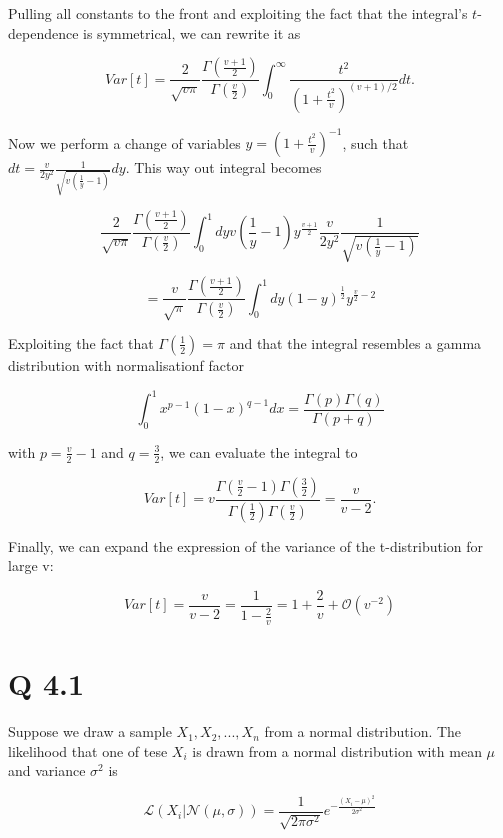 \documentclass[11pt]{article}
\begin{document}
Pulling all constants to the front and exploiting the fact that the
integral's \(t\)-dependence is symmetrical, we can rewrite it as

\[Var[t]= \frac{2}{\sqrt{v  \pi}} \frac{\Gamma{\left( \frac{v+1}{2} \right)}}{\Gamma{\left( \frac{v}{2} \right)}} \int_{0}^{\infty} \frac{t^2}{\left( 1+ \frac{t^{2}}{v} \right)^{(v+1)/2}} dt.\]

Now we perform a change of variables \(y=(1+\frac{t^2}{v})^{-1}\), such
that
\(dt=\frac{v}{2 y^2} \frac{1}{\sqrt{v \left( \frac{1}{y}-1 \right)}}dy\).
This way out integral becomes

\[ \frac{2}{\sqrt{v  \pi}} \frac{\Gamma{\left( \frac{v+1}{2} \right)}}{\Gamma{\left( \frac{v}{2} \right)}} \int_{0}^{1} dy v \left(\frac{1}{y}-1 \right) y^{\frac{v+1}{2}} \frac{v}{2 y^2} \frac{1}{\sqrt{v \left( \frac{1}{y}-1 \right)}} \]

\[= \frac{v}{\sqrt{\pi}} \frac{\Gamma{\left( \frac{v+1}{2} \right)}}{\Gamma{\left( \frac{v}{2} \right)}} \int_{0}^{1} dy \left( 1-y \right)^\frac{1}{2} y^{\frac{v}{2}-2}\]

Exploiting the fact that \(\Gamma{(\frac{1}{2})}=\pi\) and that the
integral resembles a gamma distribution with normalisationf factor

\[\int_{0}^{1}  x^{p-1} (1-x)^{q-1} dx =\frac{\Gamma{(p)}\Gamma{(q)}}{\Gamma{(p+q)}} \]

with \(p=\frac{v}{2}-1\) and \(q=\frac{3}{2}\), we can evaluate the
integral to

\[ Var[t]=v \frac{\Gamma{(\frac{v}{2}-1)}\Gamma{(\frac{3}{2})}}{\Gamma{(\frac{1}{2})}\Gamma{(\frac{v}{2})}}=\frac{v}{v-2}.  \]

Finally, we can expand the expression of the variance of the
t-distribution for large v:

\[ Var[t]=\frac{v}{v-2}= \frac{1}{1-\frac{2}{v}} = 1+\frac{2}{v} +\mathcal{O}(v^{-2})\]

    \section{Q 4.1}\label{q-4.1}

    Suppose we draw a sample \(X_1, X_2, ..., X_n\) from a normal
distribution. The likelihood that one of tese \(X_i\) is drawn from a
normal distribution with mean \(μ\) and variance \(σ^2\) is

\[ \mathcal{L} \left( X_i  | \mathcal{N}(μ, σ) \right)=\frac{1}{\sqrt{2 \pi σ^2}} e^{-\frac{(X_i-μ)^2}{2σ^2}}  \]
\end{document}
